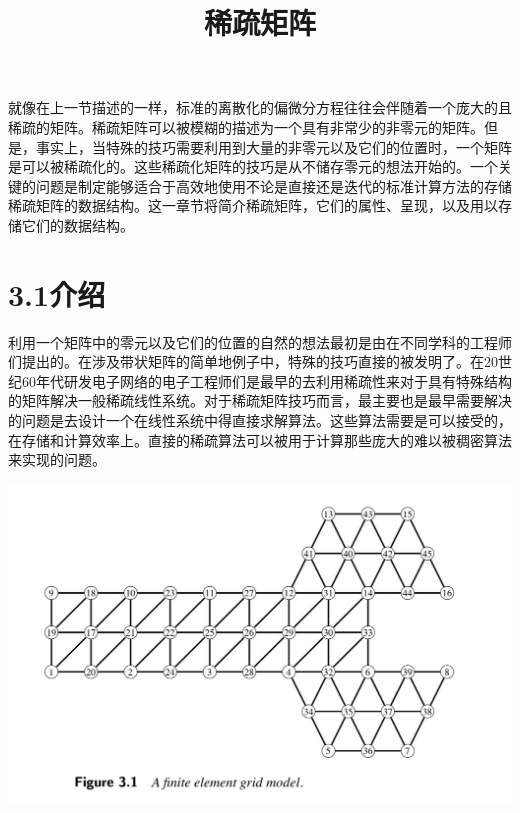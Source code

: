 \documentclass{article}
\begin{document}
  

\title{稀疏矩阵}
\date{}

\maketitle



就像在上一节描述的一样，标准的离散化的偏微分方程往往会伴随着一个庞大的且稀疏的矩阵。稀疏矩阵可以被模糊的描述为一个具有非常少的非零元的矩阵。但是，事实上，当特殊的技巧需要利用到大量的非零元以及它们的位置时，一个矩阵是可以被稀疏化的。这些稀疏化矩阵的技巧是从不储存零元的想法开始的。一个关键的问题是制定能够适合于高效地使用不论是直接还是迭代的标准计算方法的存储稀疏矩阵的数据结构。这一章节将简介稀疏矩阵，它们的属性、呈现，以及用以存储它们的数据结构。
\newline\newline

\section*{3.1介绍}

利用一个矩阵中的零元以及它们的位置的自然的想法最初是由在不同学科的工程师们提出的。在涉及带状矩阵的简单地例子中，特殊的技巧直接的被发明了。在20世纪60年代研发电子网络的电子工程师们是最早的去利用稀疏性来对于具有特殊结构的矩阵解决一般稀疏线性系统。对于稀疏矩阵技巧而言，最主要也是最早需要解决的问题是去设计一个在线性系统中得直接求解算法。这些算法需要是可以接受的，在存储和计算效率上。直接的稀疏算法可以被用于计算那些庞大的难以被稠密算法来实现的问题。
\newline\newline\newline\newline\newline\newline\newline\newline

\includegraphics[scale=0.25]{3_1.png}
\end{document}
